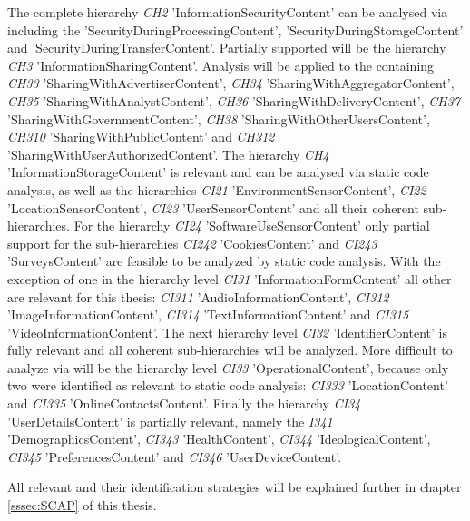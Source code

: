 The complete hierarchy \textit{CH2} 'InformationSecurityContent' can be analysed via \sca including the \ipp 'SecurityDuringProcessingContent', 'SecurityDuringStorageContent' and 'SecurityDuringTransferContent'.
Partially supported will be the hierarchy \textit{CH3} 'InformationSharingContent'. Analysis will be applied to the containing \ipp \textit{CH33} 'SharingWithAdvertiserContent', \textit{CH34} 'SharingWithAggregatorContent', \textit{CH35} 'SharingWithAnalystContent', \textit{CH36} 'SharingWithDeliveryContent', \textit{CH37} 'SharingWithGovernmentContent', \textit{CH38} 'SharingWithOtherUsersContent', \textit{CH310} 'SharingWithPublicContent' and \textit{CH312} 'SharingWithUserAuthorizedContent'.
The hierarchy \textit{CH4} 'InformationStorageContent' is relevant and can be analysed via static code analysis, as well as the hierarchies \textit{CI21} 'EnvironmentSensorContent', \textit{CI22} 'LocationSensorContent', \textit{CI23} 'UserSensorContent' and all their coherent sub-hierarchies.
For the hierarchy \textit{CI24} 'SoftwareUseSensorContent' only partial support for the sub-hierarchies \textit{CI242} 'CookiesContent' and \textit{CI243} 'SurveysContent' are feasible to be analyzed by static code analysis.
With the exception of one \ipp in the hierarchy level \textit{CI31} 'InformationFormContent' all other \ipp are relevant for this thesis: \textit{CI311} 'AudioInformationContent', \textit{CI312} 'ImageInformationContent', \textit{CI314} 'TextInformationContent' and \textit{CI315} 'VideoInformationContent'.
The next hierarchy level \textit{CI32} 'IdentifierContent' is fully relevant and all coherent sub-hierarchies will be analyzed.
More difficult to analyze via \sca will be the hierarchy level \textit{CI33} 'OperationalContent', because only two \ipp were identified as relevant to static code analysis: \textit{CI333} 'LocationContent' and \textit{CI335} 'OnlineContactsContent'.
Finally the hierarchy \textit{CI34} 'UserDetailsContent' is partially relevant, namely the \ipp \textit{I341} 'DemographicsContent', \textit{CI343} 'HealthContent', \textit{CI344} 'IdeologicalContent', \textit{CI345} 'PreferencesContent' and \textit{CI346} 'UserDeviceContent'.

All relevant \ipp and their \sca identification strategies will be explained further in chapter \ref{sssec:SCAP} of this thesis.
